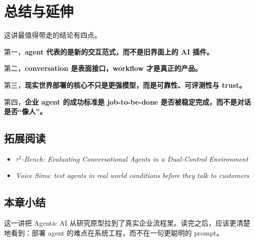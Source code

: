 \documentclass[a4paper]{article}
\begin{document}
\section{总结与延伸}
这讲最值得带走的结论有四点。

第一，\textbf{agent 代表的是新的交互范式，而不是旧界面上的 AI 插件。}

第二，\textbf{conversation 是表面接口，workflow 才是真正的产品。}

第三，\textbf{现实世界部署的核心不只是更强模型，而是可靠性、可评测性与 trust。}

第四，\textbf{企业 agent 的成功标准是 job-to-be-done 是否被稳定完成，而不是对话是否“像人”。}

\subsection{拓展阅读}
\begin{itemize}[leftmargin=1.5em]
\item \emph{$\tau^2$-Bench: Evaluating Conversational Agents in a Dual-Control Environment}
\item \emph{Voice Sims: test agents in real world conditions before they talk to customers}
\end{itemize}

\subsection{本章小结}
这一讲把 Agentic AI 从研究原型拉到了真实企业流程里。读完之后，应该更清楚地看到：部署 agent 的难点在系统工程，而不在一句更聪明的 prompt。
\end{document}
